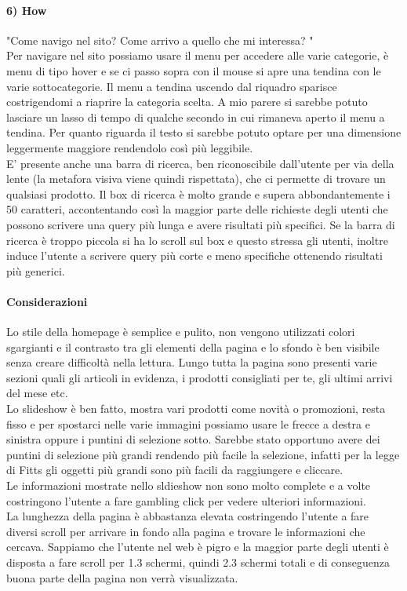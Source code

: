 \documentclass[12pt]{article}
\begin{document}
	\paragraph{6) How} "Come navigo nel sito? Come arrivo a quello che mi interessa? "
	\\
	Per navigare nel sito possiamo usare il menu per accedere alle varie categorie, è menu di tipo hover e se ci passo sopra con il mouse si apre una tendina con le varie sottocategorie. Il menu a tendina uscendo dal riquadro sparisce costrigendomi a riaprire la categoria scelta. A mio parere si sarebbe potuto lasciare un lasso di tempo di qualche secondo in cui rimaneva aperto il menu a tendina. Per quanto riguarda il testo si sarebbe potuto optare per una dimensione leggermente maggiore rendendolo così più leggibile.  \\
	E' presente anche una barra di ricerca, ben riconoscibile dall'utente per via della lente (la metafora visiva viene quindi rispettata), che ci permette di trovare un qualsiasi prodotto. Il box di ricerca è molto grande e supera abbondantemente i 50 caratteri, accontentando così la maggior parte delle richieste degli utenti che possono scrivere una query più lunga e avere risultati più specifici.  Se la barra di ricerca è troppo piccola si ha lo scroll sul box e questo stressa gli utenti, inoltre induce l'utente a scrivere query più corte e meno specifiche ottenendo risultati più generici.
	\newpage
	\paragraph{Considerazioni}
	Lo stile della homepage è semplice e pulito, non vengono utilizzati colori sgargianti e il contrasto tra gli elementi della pagina e lo sfondo è ben visibile senza creare difficoltà nella lettura.
	Lungo tutta la pagina sono presenti varie sezioni quali gli articoli in evidenza, i prodotti consigliati per te, gli ultimi arrivi del mese etc. 
	\\
	Lo slideshow è ben fatto, mostra vari prodotti come novità o promozioni, resta fisso e per spostarci nelle varie immagini possiamo usare le frecce a destra e sinistra oppure i puntini di selezione sotto. Sarebbe stato opportuno avere dei puntini di selezione più grandi rendendo più facile la selezione, infatti per la legge di Fitts gli oggetti più grandi sono più facili da raggiungere e cliccare.\\ Le informazioni mostrate nello sldieshow non sono molto complete e a volte costringono l'utente a fare gambling click per vedere ulteriori informazioni.\\
	La lunghezza della pagina è abbastanza elevata costringendo l'utente a fare diversi scroll per arrivare in fondo alla pagina e trovare le informazioni che cercava. Sappiamo che l'utente nel web è pigro e la maggior parte degli utenti è disposta a fare scroll per 1.3 schermi, quindi 2.3 schermi totali e di conseguenza buona parte della pagina non verrà visualizzata. 
	\newpage
\end{document}
